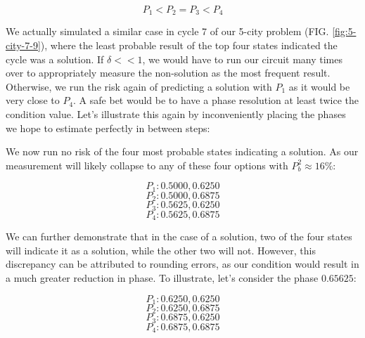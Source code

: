\documentclass[msc,oneside]{ubcthesis}
\begin{document}
 $$P_1 < P_2 = P_3 < P_4$$
 
We actually simulated a similar case in cycle 7 of our 5-city problem (FIG. \ref{fig:5-city-7-9}), where the least probable result of the top four states indicated the cycle was a solution. If $\delta << 1$, we would have to run our circuit many times over to appropriately measure the non-solution as the most frequent result. Otherwise, we run the risk again of predicting a solution with $P_1$ as it would be very close to $P_4$. A safe bet would be to have a phase resolution at least twice the condition value. Let's illustrate this again by inconveniently placing the phases we hope to estimate perfectly in between steps:
 
 
 We now run no risk of the four most probable states indicating a solution. As our measurement will likely collapse to any of these four options with $P^2_b \approx 16\%$:
 
 $$P_1: 0.5000, 0.6250$$
 $$P_2: 0.5000, 0.6875$$
 $$P_3: 0.5625, 0.6250$$
 $$P_4: 0.5625, 0.6875$$
 
We can further demonstrate that in the case of a solution, two of the four states will indicate it as a solution, while the other two will not. However, this discrepancy can be attributed to rounding errors, as our condition would result in a much greater reduction in phase. To illustrate, let's consider the phase $0.65625$:



$$P_1: 0.6250, 0.6250$$
$$P_2: 0.6250, 0.6875$$
$$P_3: 0.6875, 0.6250$$
$$P_4: 0.6875, 0.6875$$
\end{document}
